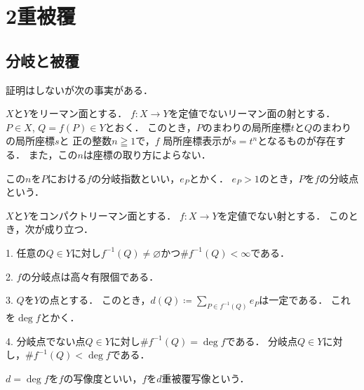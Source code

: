 \section{2重被覆}
\subsection{分岐と被覆}
証明はしないが次の事実がある．
\begin{Fact}\label{fact:branch}
    $X$と$Y$をリーマン面とする．
    $f\colon X\to Y$を定値でないリーマン面の射とする．
    $P\in X$, $Q=f(P)\in Y$とおく．
    このとき，$P$のまわりの局所座標$t$と$Q$のまわりの局所座標$s$と
    正の整数$n\geqq 1$で，$f$
    局所座標表示が$s=t^n$となるものが存在する．
    また，この$n$は座標の取り方によらない．    
\end{Fact}
この$n$を$P$における$f$の分岐指数といい，$e_P$とかく．
$e_P>1$のとき，$P$を$f$の分岐点という．
\begin{Fact}\label{fact:deg}
    $X$と$Y$をコンパクトリーマン面とする．
    $f\colon X\to Y$を定値でない射とする．
    このとき，次が成り立つ．
    
    1.
    任意の$Q\in Y$に対し$f^{-1}(Q)\neq\varnothing$かつ$\#f^{-1}(Q)<\infty$である．
    
    2. 
    $f$の分岐点は高々有限個である．
    
    3. 
    $Q$を$Y$の点とする．
    このとき，$d(Q)\coloneqq \sum_{P\in f^{-1}(Q)}e_P$は一定である．
    これを$\deg f$とかく．
    
    4. 
    分岐点でない点$Q\in Y$に対し$\# f^{-1}(Q)=\deg f$である．
    分岐点$Q\in Y$に対し，$\# f^{-1}(Q)<\deg f$である．
\end{Fact}

$d=\deg f$を$f$の写像度といい，$f$を$d$重被覆写像という．


